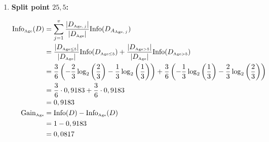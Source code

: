 \documentclass[
english,
smallborders
]{i6prcsht}
\newcommand{\OfSpecificValue}[3]{_{\text{\tiny #1#2#3}}}
\newcommand{\OfAttribute}[1]{_{\text{\tiny #1}}}
\begin{document}
\begin{solution}
\begin{enumerate}
\begin{enumerate}
\begin{enumerate}
\begin{enumerate}
					                  \item \textbf{Split point $25,5$:}

					                        \begin{alignat*}{2}
						                        \text{Info}\OfAttribute{Age}(D) & = \sum_{j=1}^v \frac{|D\OfAttribute{Age$,j$}|}{|D\OfAttribute{Age}|} \text{Info}(D_{A\OfAttribute{Age$,j$}})                                                                                                                            \\
						                                                        & = \frac{|D\OfSpecificValue{Age}{$\leq$}{5}|}{|D\OfAttribute{Age}|} \text{Info}(D\OfSpecificValue{Age}{$\leq$}{5}) + \frac{|D\OfSpecificValue{Age}{$>$}{5}|}{|D\OfAttribute{Age}|} \text{Info}(D\OfSpecificValue{Age}{$>$}{5})           \\
						                                                        & = \frac{3}{6} \left(-\frac{2}{3} \log_2\left(\frac{2}{3}\right) - \frac{1}{3} \log_2\left(\frac{1}{3}\right)\right) + \frac{3}{6} \left(-\frac{1}{3} \log_2\left(\frac{1}{3}\right) - \frac{2}{3} \log_2\left(\frac{2}{3}\right)\right) \\
						                                                        & = \frac{3}{6} \cdot 0,9183 + \frac{3}{6} \cdot 0,9183                                                                                                                                                                                   \\
						                                                        & = 0,9183                                                                                                                                                                                                                                \\
						                        \text{Gain}\OfAttribute{Age}    & = \text{Info}(D) - \text{Info}\OfAttribute{Age}(D)                                                                                                                                                                                      \\
						                                                        & = 1 - 0,9183                                                                                                                                                                                                                            \\
						                                                        & = 0,0817                                                                                                                                                                                                                                \\
					                        \end{alignat*}


\end{enumerate}
\end{enumerate}
\end{enumerate}
\end{enumerate}
\end{solution}
\end{document}
